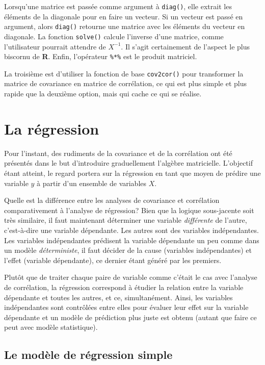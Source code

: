 \documentclass[
]{book}
\begin{document}
Lorsqu'une matrice est passée comme argument à \texttt{diag()}, elle extrait les éléments de la diagonale pour en faire un vecteur. Si un vecteur est passé en argument, alors \texttt{diag()} retourne une matrice avec les éléments du vecteur en diagonale. La fonction \texttt{solve()} calcule l'inverse d'une matrice, comme l'utilisateur pourrait attendre de \(X^{-1}\). Il s'agit certainement de l'aspect le plus biscornu de \textbf{R}. Enfin, l'opérateur \texttt{\%*\%} est le produit matriciel.

La troisième est d'utiliser la fonction de base \texttt{cov2cor()} pour transformer la matrice de covariance en matrice de corrélation, ce qui est plus simple et plus rapide que la deuxième option, mais qui cache ce qui se réalise.

\hypertarget{la-ruxe9gression}{%
\section{La régression}\label{la-ruxe9gression}}

Pour l'instant, des rudiments de la covariance et de la corrélation ont été présentés dans le but d'introduire graduellement l'algèbre matricielle. L'objectif étant atteint, le regard portera sur la régression en tant que moyen de prédire une variable \(y\) à partir d'un ensemble de variables \(X\).

Quelle est la différence entre les analyses de covariance et corrélation comparativement à l'analyse de régression? Bien que la logique sous-jacente soit très similaire, il faut maintenant déterminer une variable \emph{différente} de l'autre, c'est-à-dire une variable dépendante. Les autres sont des variables indépendantes. Les variables indépendantes prédisent la variable dépendante un peu comme dans un modèle \emph{déterministe}, il faut décider de la cause (variables indépendantes) et l'effet (variable dépendante), ce dernier étant généré par les premiers.

Plutôt que de traiter chaque paire de variable comme c'était le cas avec l'analyse de corrélation, la régression correspond à étudier la relation entre la variable dépendante et toutes les autres, et ce, simultanément. Ainsi, les variables indépendantes sont contrôlées entre elles pour évaluer leur effet sur la variable dépendante et un modèle de prédiction plus juste est obtenu (autant que faire ce peut avec modèle statistique).

\hypertarget{le-moduxe8le-de-ruxe9gression-simple}{%
\subsection{Le modèle de régression simple}\label{le-moduxe8le-de-ruxe9gression-simple}}
\end{document}

